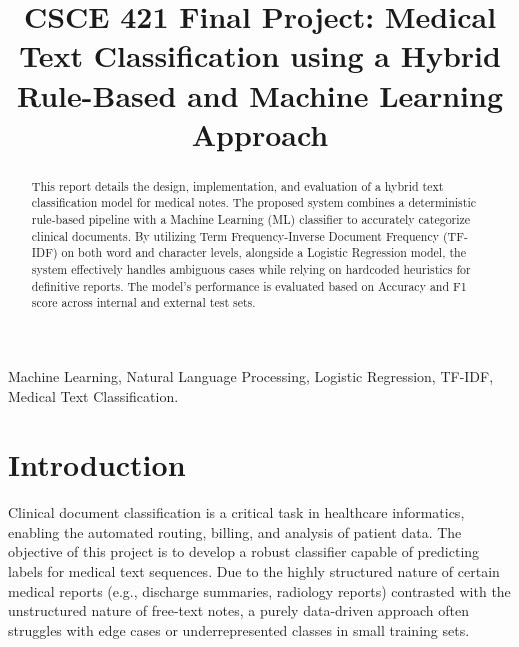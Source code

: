 \documentclass[conference]{IEEEtran}
\begin{document}
\title{CSCE 421 Final Project: Medical Text Classification using a Hybrid Rule-Based and Machine Learning Approach}

\author{
\and
{}
\and
{}
}
\maketitle

\begin{abstract}
This report details the design, implementation, and evaluation of a hybrid text classification model for medical notes. The proposed system combines a deterministic rule-based pipeline with a Machine Learning (ML) classifier to accurately categorize clinical documents. By utilizing Term Frequency-Inverse Document Frequency (TF-IDF) on both word and character levels, alongside a Logistic Regression model, the system effectively handles ambiguous cases while relying on hardcoded heuristics for definitive reports. The model's performance is evaluated based on Accuracy and F1 score across internal and external test sets.
\end{abstract}

\begin{IEEEkeywords}
Machine Learning, Natural Language Processing, Logistic Regression, TF-IDF, Medical Text Classification.
\end{IEEEkeywords}

\section{Introduction}
Clinical document classification is a critical task in healthcare informatics, enabling the automated routing, billing, and analysis of patient data. The objective of this project is to develop a robust classifier capable of predicting labels for medical text sequences. Due to the highly structured nature of certain medical reports (e.g., discharge summaries, radiology reports) contrasted with the unstructured nature of free-text notes, a purely data-driven approach often struggles with edge cases or underrepresented classes in small training sets. 
\end{document}
